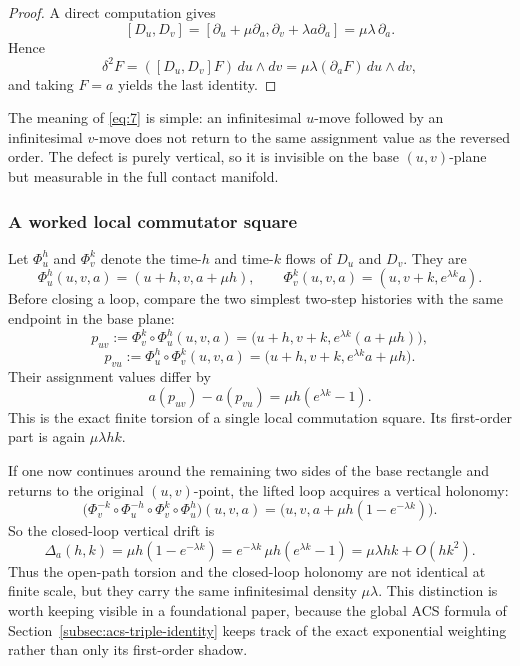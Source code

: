 \begin{proof}
A direct computation gives
\[
    [D_u,D_v]
    =[\partial_u+\mu\partial_a,\partial_v+\lambda a\partial_a]
    =\mu\lambda\,\partial_a.
\]
Hence
\[
    \delta^2F
    =([D_u,D_v]F)\,du\wedge dv
    =\mu\lambda(\partial_aF)\,du\wedge dv,
\]
and taking $F=a$ yields the last identity.
\end{proof}

The meaning of \eqref{eq:7} is simple: an infinitesimal $u$-move followed by an infinitesimal $v$-move does not return to the same assignment value as the reversed order. The defect is purely vertical, so it is invisible on the base $(u,v)$-plane but measurable in the full contact manifold.

\subsubsection*{A worked local commutator square}
Let $\Phi_u^h$ and $\Phi_v^k$ denote the time-$h$ and time-$k$ flows of $D_u$ and $D_v$. They are
\[
    \Phi_u^h(u,v,a)=(u+h,v,a+\mu h),
    \qquad
    \Phi_v^k(u,v,a)=(u,v+k,e^{\lambda k}a).
\]
Before closing a loop, compare the two simplest two-step histories with the same endpoint in the base plane:
\[
    p_{uv}:=\Phi_v^k\!\circ\Phi_u^h(u,v,a)
    =\bigl(u+h,v+k,e^{\lambda k}(a+\mu h)\bigr),
\]
\[
    p_{vu}:=\Phi_u^h\!\circ\Phi_v^k(u,v,a)
    =\bigl(u+h,v+k,e^{\lambda k}a+\mu h\bigr).
\]
Their assignment values differ by
\[
    a(p_{uv})-a(p_{vu})=\mu h(e^{\lambda k}-1).
\]
This is the exact finite torsion of a single local commutation square. Its first-order part is again $\mu\lambda hk$.

If one now continues around the remaining two sides of the base rectangle and returns to the original $(u,v)$-point, the lifted loop acquires a vertical holonomy:
\[
    \bigl(\Phi_v^{-k}\circ\Phi_u^{-h}\circ\Phi_v^{k}\circ\Phi_u^{h}\bigr)(u,v,a)
    = \bigl(u,v,a+\mu h(1-e^{-\lambda k})\bigr).
\]
So the closed-loop vertical drift is
\[
    \Delta_a(h,k)=\mu h(1-e^{-\lambda k})
    =e^{-\lambda k}\,\mu h(e^{\lambda k}-1)
    =\mu\lambda hk+O(hk^2).
\]
Thus the open-path torsion and the closed-loop holonomy are not identical at finite scale, but they carry the same infinitesimal density $\mu\lambda$. This distinction is worth keeping visible in a foundational paper, because the global ACS formula of Section~\ref{subsec:acs-triple-identity} keeps track of the exact exponential weighting rather than only its first-order shadow.

